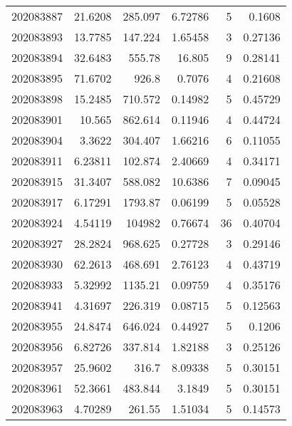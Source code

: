 \begin{tabular}{rrrrrr}
 202083887 &         21.6208  &      285.097  &            6.72786 &           5 & 0.1608  \\
 202083893 &         13.7785  &      147.224  &            1.65458 &           3 & 0.27136 \\
 202083894 &         32.6483  &      555.78   &           16.805   &           9 & 0.28141 \\
 202083895 &         71.6702  &      926.8    &            0.7076  &           4 & 0.21608 \\
 202083898 &         15.2485  &      710.572  &            0.14982 &           5 & 0.45729 \\
 202083901 &         10.565   &      862.614  &            0.11946 &           4 & 0.44724 \\
 202083904 &          3.3622  &      304.407  &            1.66216 &           6 & 0.11055 \\
 202083911 &          6.23811 &      102.874  &            2.40669 &           4 & 0.34171 \\
 202083915 &         31.3407  &      588.082  &           10.6386  &           7 & 0.09045 \\
 202083917 &          6.17291 &     1793.87   &            0.06199 &           5 & 0.05528 \\
 202083924 &          4.54119 &   104982      &            0.76674 &          36 & 0.40704 \\
 202083927 &         28.2824  &      968.625  &            0.27728 &           3 & 0.29146 \\
 202083930 &         62.2613  &      468.691  &            2.76123 &           4 & 0.43719 \\
 202083933 &          5.32992 &     1135.21   &            0.09759 &           4 & 0.35176 \\
 202083941 &          4.31697 &      226.319  &            0.08715 &           5 & 0.12563 \\
 202083955 &         24.8474  &      646.024  &            0.44927 &           5 & 0.1206  \\
 202083956 &          6.82726 &      337.814  &            1.82188 &           3 & 0.25126 \\
 202083957 &         25.9602  &      316.7    &            8.09338 &           5 & 0.30151 \\
 202083961 &         52.3661  &      483.844  &            3.1849  &           5 & 0.30151 \\
 202083963 &          4.70289 &      261.55   &            1.51034 &           5 & 0.14573 \\

\end{tabular}

